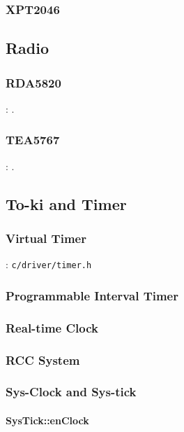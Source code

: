 \subsubsection{XPT2046}

\subsection{Radio}

\subsubsection{RDA5820}

: .

\subsubsection{TEA5767}

: .

\subsection{To-ki and Timer}
\subsubsection{Virtual Timer}
: \verb`c/driver/timer.h`

\subsubsection{Programmable Interval Timer}
\subsubsection{Real-time Clock}

\subsubsection{RCC System}

\subsubsection{Sys-Clock and Sys-tick}

\paragraph{SysTick::enClock} \

